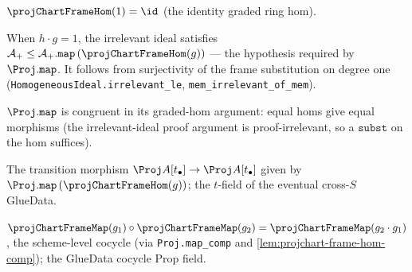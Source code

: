 \begin{lemma}

  \label{lem:projchart-frame-hom-one}
  $\projChartFrameHom(1) = \id$ (the identity graded ring hom).
\end{lemma}

\begin{lemma}

  \label{lem:projchart-frame-hom-irrelevant-le}
  When $h\cdot g = 1$, the irrelevant ideal satisfies $\mathcal A_+ \le
  \mathcal A_+.\mathtt{map}\,(\projChartFrameHom(g))$ — the hypothesis required by
  $\Proj.\mathtt{map}$. It follows from surjectivity of the frame substitution on
  degree one (\texttt{HomogeneousIdeal.irrelevant\_le},
  \texttt{mem\_irrelevant\_of\_mem}).
\end{lemma}

\begin{lemma}

  \label{lem:projchart-frame-map-congr}
  $\Proj.\mathtt{map}$ is congruent in its graded-hom argument: equal homs give
  equal morphisms (the irrelevant-ideal proof argument is proof-irrelevant, so a
  $\mathtt{subst}$ on the hom suffices).
\end{lemma}

\begin{definition}

  \label{def:projchart-frame-map}
  The transition morphism $\Proj A[t_\bullet]\to\Proj A[t_\bullet]$ given by
  $\Proj.\mathtt{map}\,(\projChartFrameHom(g))$; the $t$-field of the eventual
  cross-$S$ GlueData.
\end{definition}

\begin{lemma}

  \label{lem:projchart-frame-map-comp}
  $\projChartFrameMap(g_1)\circ\projChartFrameMap(g_2) =
  \projChartFrameMap(g_2\cdot g_1)$, the scheme-level cocycle (via
  \texttt{Proj.map\_comp} and \cref{lem:projchart-frame-hom-comp}); the GlueData
  cocycle Prop field.
\end{lemma}

